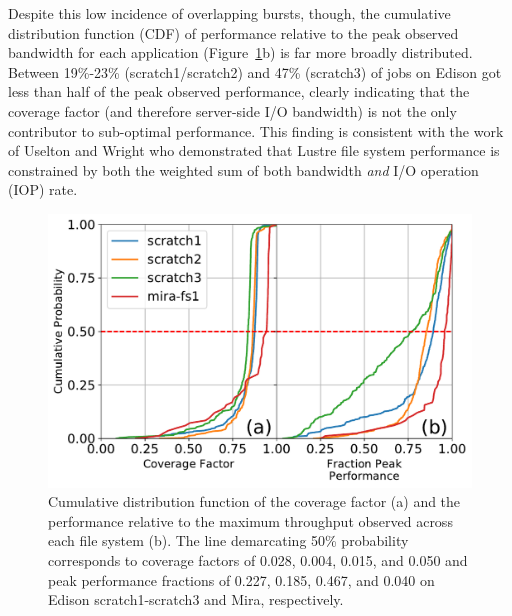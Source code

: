 \documentclass[conference,10pt,compsocconf]{IEEEtran}
\begin{document}
Despite this low incidence of overlapping bursts, though, the cumulative
distribution function (CDF) of performance relative to the peak observed
bandwidth for each application (Figure~\ref{fig:cdfs}b) is far more broadly distributed.
Between 19\%-23\% (scratch1/scratch2) and 47\% (scratch3) of jobs on Edison got less than half of the peak observed performance, clearly indicating that the coverage factor (and therefore server-side
I/O bandwidth) is not the only contributor to sub-optimal performance.  
This finding is consistent with
the work of Uselton and Wright\cite{Uselton2013} who demonstrated that Lustre
file system performance is constrained by both the weighted sum of both bandwidth
\emph{and} I/O operation (IOP) rate.  

\begin{figure}[t]
    \centering
    \includegraphics[width=\columnwidth]{figs/cdf-both.pdf}
    \caption{Cumulative distribution function of the coverage factor (a) and the
    performance relative to the maximum throughput observed across each file system
    (b).  The line demarcating 50\% probability corresponds to coverage factors of
    0.028, 0.004, 0.015, and 0.050 and peak performance fractions of 0.227, 0.185,
    0.467, and 0.040 on Edison scratch1-scratch3 and Mira, respectively.}
    \label{fig:cdfs}
\end{figure}
\end{document}
